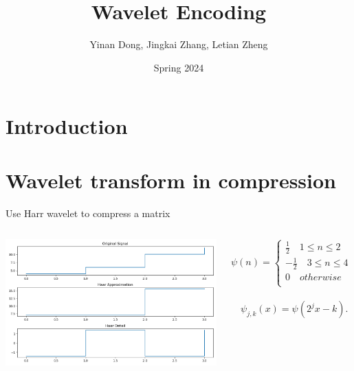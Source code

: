\documentclass{beamer}
\title{Wavelet Encoding}
\author{Yinan Dong, Jingkai Zhang, Letian Zheng}
\date{Spring 2024}
\begin{document}
\maketitle

\section{Introduction}

\section{Wavelet transform in compression}
\begin{frame}{Use Harr wavelet to compress a matrix}

\begin{columns}[T,onlytextwidth]

	
	\centering
	\includegraphics[width=.9\columnwidth]{image/haar_1}
	\begin{theorem}
		 \begin{equation} \psi (n)=\left \{
		\begin{aligned}
		 \frac{1}{2} \quad 1 \leq n \leq 2\\
		-\frac{1}{2} \quad 3 \leq n \leq 4\\
		0 \quad otherwise\\
		\end{aligned} 
		\right 
		.
		\end{equation}\\
		 $\quad \psi_{j,k} (x)=\psi(2^jx-k).$
\end{theorem}
\end{columns}

\end{frame}
\end{document}
